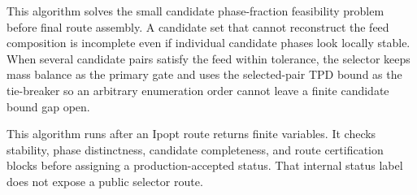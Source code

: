 \documentclass[12pt, letterpaper]{article}
\begin{document}
This algorithm solves the small candidate phase-fraction feasibility problem
before final route assembly. A candidate set that cannot reconstruct the feed
composition is incomplete even if individual candidate phases look locally
stable. When several candidate pairs satisfy the feed within tolerance, the
selector keeps mass balance as the primary gate and uses the selected-pair TPD
bound as the tie-breaker so an arbitrary enumeration order cannot leave a
finite candidate bound gap open.


This algorithm runs after an Ipopt route returns finite variables. It checks
stability, phase distinctness, candidate completeness, and route certification
blocks before assigning a production-accepted status.
That internal status label does not expose a public selector route.
\end{document}
